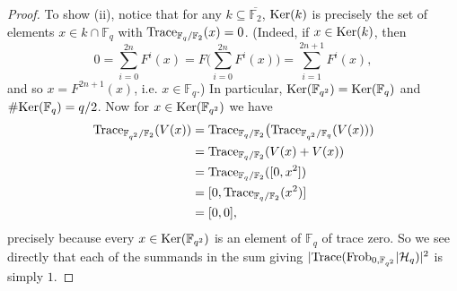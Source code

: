 \documentclass[11pt]{amsart}
\theoremstyle{plain}
\theoremstyle{definition}
\numberwithin{thm}{section}
\numberwithin{equation}{thm}
\newcommand{\Trace}{{\rm Trace}}
\newcommand{\Ker}{{\rm Ker}}
\newcommand{\sH}{{\mathcal H}}
\newcommand{\F}{{\mathbb F}}
\newcommand{\0}{\emptyset}
\newcommand{\Frob}{\mathrm{Frob}}
\begin{document}
\begin{proof}
To show (ii), notice that for any $k \subseteq \overline{\F_2}$, $\Ker(k)$ is precisely the set of elements $x \in k \cap \F_q$ with $\Trace_{\F_q/\F_2}(x)=0$. (Indeed, 
if $x \in \Ker(k)$, then 
$$0=\sum^{2n}_{i=0}F^i(x) = F\bigl(\sum^{2n}_{i=0}F^i(x)\bigr) = \sum^{2n+1}_{i=1}F^i(x),$$
and so $x=F^{2n+1}(x)$, i.e. $x \in \F_q$.)
In particular, $\Ker(\F_{q^2}) = \Ker(\F_q)$ and $\#\Ker(\F_q)=q/2$. Now for $x \in \Ker(\F_{q^2} )$ we have
$$\begin{aligned}\Trace_{\F_{q^2}/\F_2}(V(x))& =\Trace_{\F_{q}/\F_2}\bigl(\Trace_{\F_{q^2}/\F_q}(V(x)))\\
  & = \Trace_{\F_{q}/\F_2}(V(x)+V(x))\\ & = \Trace_{\F_{q}/\F_2}([0,x^2])\\
  & = [0,\Trace_{\F_{q}/\F_2}(x^2)]\\ & =[0,0],\end{aligned}$$
precisely because every $x \in \Ker(\F_{q^2})$ is an element of $\F_q$ of trace zero. So we see directly that each of the summands in the sum giving $|\Trace(\Frob_{0,\F_{q^2}}|\sH_q)|^2$ is simply $1$.
%
\end{proof}
\end{document}
